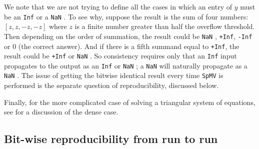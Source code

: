 \documentclass[manuscript,review]{acmart}
\begin{document}
We note that we are not trying to define all the cases in which an entry of $y$
must be an \texttt{Inf} or a \texttt{NaN} . To see why, suppose the result
is the sum of four numbers: $[z, z, -z, -z]$ where $z$ is a finite number greater than
half the overflow threshold. Then depending on the order of summation, the result
could be \texttt{NaN} , \texttt{+Inf}, \texttt{-Inf} or 0 (the correct answer). And if there is a fifth summand
equal to \texttt{+Inf}, the result could be \texttt{+Inf} or \texttt{NaN} . So consistency requires only that
an \texttt{Inf} input propagates to the output as an \texttt{Inf} or \texttt{NaN} ; a \texttt{NaN}  will naturally
propagate as a \texttt{NaN} . The issue of getting the bitwise identical result every time \texttt{SpMV}
is performed is the separate question of reproducibility, discussed below.

Finally, for the more complicated case of solving a triangular
system of equations, see \cite{Proposed_BLAS_LAPACK_exception_handling}
for a discussion of the dense case.


\subsection{Bit-wise reproducibility from run to run} \label{sec:BitwiseReproducibility}

\end{document}
